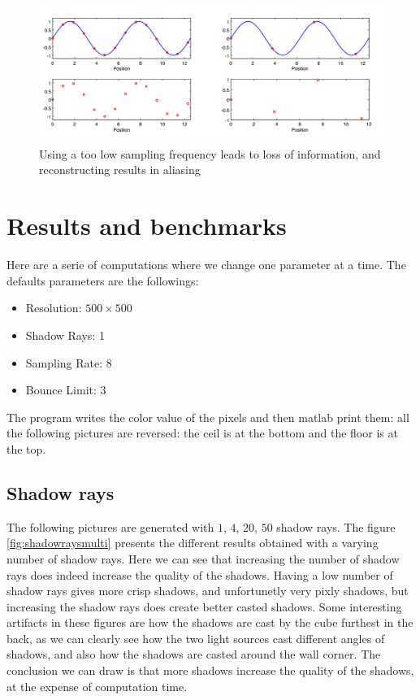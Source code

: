 \documentclass[12pt]{article}
\numberwithin{equation}{section}
\begin{document}
\begin{figure}
  \begin{center}
    \includegraphics[scale=0.6]{../result/supersampling.png}
    \caption{Using a too low sampling frequency leads to loss of information, and reconstructing results in aliasing}
    \label{fig:aliasing}
  \end{center}
\end{figure}



\section{Results and benchmarks}
Here are a serie of computations where we change one parameter at a time. The defaults parameters are the followings:
\begin{itemize}
\item Resolution: $500 \times 500$
\item Shadow Rays: 1
\item Sampling Rate: 8
\item Bounce Limit: 3

\end{itemize}

The program writes the color value of the pixels and then matlab print them: all the following pictures are reversed: the ceil is at the bottom and the floor is at the top. 
\subsection{Shadow rays}

The following pictures are generated with $1$, $4$, $20$, $50$ shadow rays. The figure \ref{fig:shadowraysmulti} presents the different results obtained with a varying number of shadow rays. Here we can see that increasing the number of shadow rays does indeed increase the quality of the shadows. Having a low number of shadow rays gives more crisp shadows, and unfortunetly very pixly shadows, but increasing the shadow rays does create better casted shadows. Some interesting artifacts in these figures are how the shadows are cast by the cube furthest in the back, as we can clearly see how the two light sources cast different angles of shadows, and also how the shadows are casted around the wall corner. The conclusion we can draw is that more shadows increase the quality of the shadows, at the expense of computation time. \\
\end{document}
